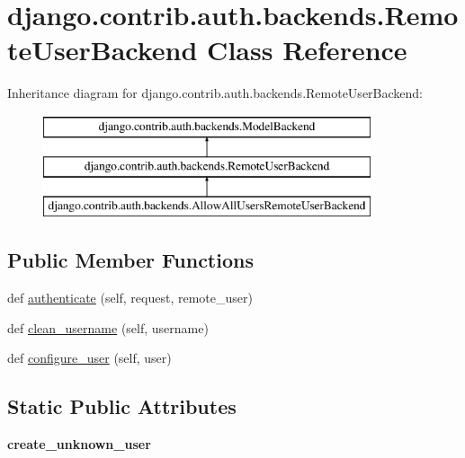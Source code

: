 \hypertarget{classdjango_1_1contrib_1_1auth_1_1backends_1_1_remote_user_backend}{}\section{django.\+contrib.\+auth.\+backends.\+Remote\+User\+Backend Class Reference}
\label{classdjango_1_1contrib_1_1auth_1_1backends_1_1_remote_user_backend}
Inheritance diagram for django.\+contrib.\+auth.\+backends.\+Remote\+User\+Backend\+:\begin{figure}[H]
\begin{center}
\leavevmode
\includegraphics[height=3.000000cm]{classdjango_1_1contrib_1_1auth_1_1backends_1_1_remote_user_backend}
\end{center}
\end{figure}
\subsection*{Public Member Functions}
\begin{DoxyCompactItemize}
\item 
def \mbox{\hyperlink{classdjango_1_1contrib_1_1auth_1_1backends_1_1_remote_user_backend_ac8cf8664a101ff979ca3d3c4ff6f7bc7}{authenticate}} (self, request, remote\+\_\+user)
\item 
def \mbox{\hyperlink{classdjango_1_1contrib_1_1auth_1_1backends_1_1_remote_user_backend_a9f9b271e93cc575b10dfa0a132addf3f}{clean\+\_\+username}} (self, username)
\item 
def \mbox{\hyperlink{classdjango_1_1contrib_1_1auth_1_1backends_1_1_remote_user_backend_a510c1101bacdfbd232704add825de866}{configure\+\_\+user}} (self, user)
\end{DoxyCompactItemize}
\subsection*{Static Public Attributes}
\begin{DoxyCompactItemize}
\item 
\mbox{\label{classdjango_1_1contrib_1_1auth_1_1backends_1_1_remote_user_backend_a7c3baf3a9c317278f44f545bd12cfecf}} 
{\bfseries create\+\_\+unknown\+\_\+user}
\end{DoxyCompactItemize}


